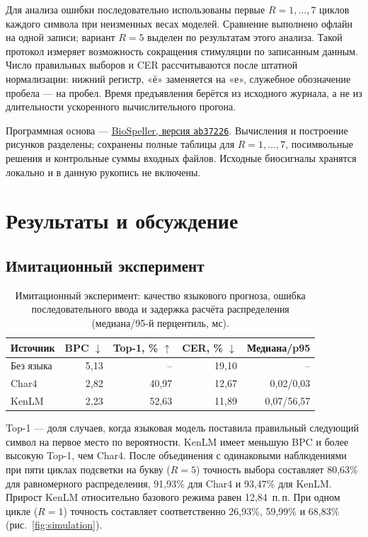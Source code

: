 \documentclass[11pt,a4paper]{article}
\newcommand{\BaseAcc}{80,63}
\newcommand{\CharAcc}{91,93}
\newcommand{\KenAcc}{93,47}
\newcommand{\KenGain}{12,84}
\begin{document}
Для анализа ошибки последовательно использованы первые $R=1,\ldots,7$ циклов каждого символа при неизменных весах моделей. Сравнение выполнено офлайн на одной записи; вариант $R=5$ выделен по результатам этого анализа. Такой протокол измеряет возможность сокращения стимуляции по записанным данным. Число правильных выборов и CER рассчитываются после штатной нормализации: нижний регистр, «ё» заменяется на «е», служебное обозначение пробела --- на пробел. Время предъявления берётся из исходного журнала, а не из длительности ускоренного вычислительного прогона.

Программная основа --- \href{https://github.com/biospellerorg/speller1p/tree/ab37226e62ea9e05f853466cd6a74cda33f5dc9d}{BioSpeller, версия \texttt{ab37226}}. Вычисления и построение рисунков разделены; сохранены полные таблицы для $R=1,\ldots,7$, посимвольные решения и контрольные суммы входных файлов. Исходные биосигналы хранятся локально и в данную рукопись не включены.

\section{Результаты и обсуждение}
\subsection{Имитационный эксперимент}
\begin{table}[h]
\caption{Имитационный эксперимент: качество языкового прогноза, ошибка последовательного ввода и задержка расчёта распределения (медиана/95-й перцентиль, мс).}
\small\centering
\begin{tabular}{@{}lrrrr@{}}\toprule
Источник & BPC $\downarrow$ & Top-1, \% $\uparrow$ & CER, \% $\downarrow$ & Медиана/p95 \\\midrule
Без языка & 5,13 & -- & 19,10 & -- \\
Char4 & 2,82 & 40,97 & 12,67 & 0,02/0,03 \\
KenLM & 2,23 & 52,63 & 11,89 & 0,07/56,57 \\
\bottomrule\end{tabular}
\end{table}

Top-1 --- доля случаев, когда языковая модель поставила правильный следующий символ на первое место по вероятности. KenLM имеет меньшую BPC и более высокую Top-1, чем Char4. После объединения с одинаковыми наблюдениями при пяти циклах подсветки на букву ($R=5$) точность выбора составляет \BaseAcc\% для равномерного распределения, \CharAcc\% для Char4 и \KenAcc\% для KenLM. Прирост KenLM относительно базового режима равен \KenGain\ п.\,п. При одном цикле ($R=1$) точность составляет соответственно 26,93\%, 59,99\% и 68,83\% (рис.~\ref{fig:simulation}).
\end{document}
